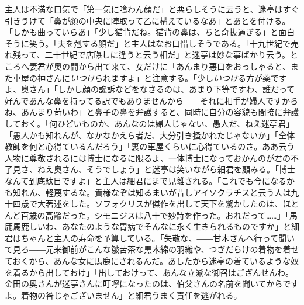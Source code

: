 \documentclass[12pt, openright]{book}
\begin{document}
主人は不満な口気で「第一気に喰わん顔だ」と悪らしそうに云うと、迷亭はすぐ引きうけて「鼻が顔の中央に陣取って乙に構えているなあ」とあとを付ける。「しかも曲っていらあ」「少し猫背だね。猫背の鼻は、ちと奇抜過ぎる」と面白そうに笑う。「夫を剋する顔だ」と主人はなお口惜しそうである。「十九世紀で売れ残って、二十世紀で店曝しに逢うと云う相だ」と迷亭は妙な事ばかり云う。ところへ妻君が奥の間から出て来て、女だけに「あんまり悪口をおっしゃると、また車屋の神さんに\emph{いつけ}られますよ」と注意する。「少し\emph{いつけ}る方が薬ですよ、奥さん」「しかし顔の讒訴などをなさるのは、あまり下等ですわ、誰だって好んであんな鼻を持ってる訳でもありませんから――それに相手が婦人ですからね、あんまり苛いわ」と鼻子の鼻を弁護すると、同時に自分の容貌も間接に弁護しておく。「何ひどいものか、あんなのは婦人じゃない、愚人だ、ねえ迷亭君」「愚人かも知れんが、なかなかえら者だ、大分引き掻かれたじゃないか」「全体教師を何と心得ているんだろう」「裏の車屋くらいに心得ているのさ。ああ云う人物に尊敬されるには博士になるに限るよ、一体博士になっておかんのが君の不了見さ、ねえ奥さん、そうでしょう」と迷亭は笑いながら細君を顧みる。「博士なんて到底駄目ですよ」と主人は細君にまで見離される。「これでも今になるかも知れん、軽蔑するな。貴様なぞは知るまいが昔しアイソクラチスと云う人は九十四歳で大著述をした。ソフォクリスが傑作を出して天下を驚かしたのは、ほとんど百歳の高齢だった。シモニジスは八十で妙詩を作った。おれだって\ldots{}\ldots{}」「馬鹿馬鹿しいわ、あなたのような胃病でそんなに永く生きられるものですか」と細君はちゃんと主人の寿命を予算している。「失敬な、――甘木さんへ行って聞いて見ろ――元来御前がこんな皺苦茶な黒木綿の羽織や、つぎだらけの着物を着せておくから、あんな女に馬鹿にされるんだ。あしたから迷亭の着ているような奴を着るから出しておけ」「出しておけって、あんな立派な御召はござんせんわ。金田の奥さんが迷亭さんに叮嚀になったのは、伯父さんの名前を聞いてからですよ。着物の咎じゃございません」と細君うまく責任を逃がれる。
\end{document}
